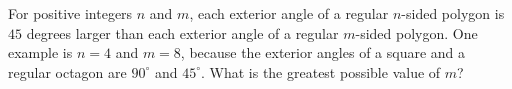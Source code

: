 For positive integers $n$ and $m$, each exterior angle of a regular $n$-sided polygon is $45$ degrees larger than each exterior angle of a regular $m$-sided polygon. One example is $n=4$ and $m=8$, because the exterior angles of a square and a regular octagon are $90^\circ$ and $45^\circ$. What is the greatest possible value of $m$?

